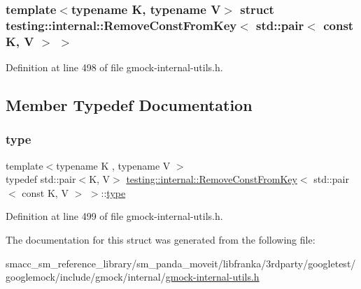 \subsubsection*{template$<$typename K, typename V$>$\newline
struct testing\+::internal\+::\+Remove\+Const\+From\+Key$<$ std\+::pair$<$ const K, V $>$ $>$}



Definition at line 498 of file gmock-\/internal-\/utils.\+h.



\subsection{Member Typedef Documentation}
\mbox{\label{structtesting_1_1internal_1_1RemoveConstFromKey_3_01std_1_1pair_3_01const_01K_00_01V_01_4_01_4_ac1d76274964aa8172889a4714246e86f}} 
\subsubsection{\texorpdfstring{type}{type}}
{\footnotesize\ttfamily template$<$typename K , typename V $>$ \\
typedef std\+::pair$<$K, V$>$ \hyperlink{structtesting_1_1internal_1_1RemoveConstFromKey}{testing\+::internal\+::\+Remove\+Const\+From\+Key}$<$ std\+::pair$<$ const K, V $>$ $>$\+::\hyperlink{structtesting_1_1internal_1_1RemoveConstFromKey_3_01std_1_1pair_3_01const_01K_00_01V_01_4_01_4_ac1d76274964aa8172889a4714246e86f}{type}}



Definition at line 499 of file gmock-\/internal-\/utils.\+h.



The documentation for this struct was generated from the following file\+:\begin{DoxyCompactItemize}
\item 
smacc\+\_\+sm\+\_\+reference\+\_\+library/sm\+\_\+panda\+\_\+moveit/libfranka/3rdparty/googletest/googlemock/include/gmock/internal/\hyperlink{gmock-internal-utils_8h}{gmock-\/internal-\/utils.\+h}\end{DoxyCompactItemize}
